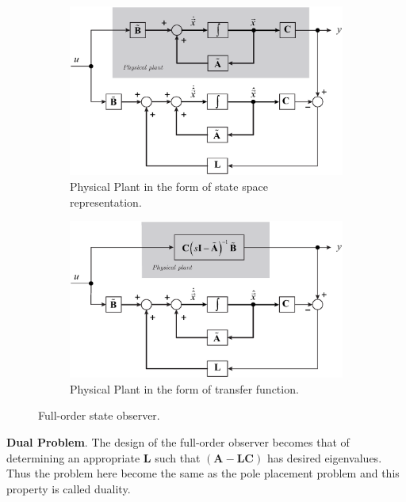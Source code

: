 \documentclass[11pt,a4paper,oneside]{book}
\numberwithin{equation}{section}
\theoremstyle{it}
\theoremstyle{definition}
\begin{document}
\begin{figure}[H]
	\centering
	\begin{subfigure}{.75\textwidth}
	\centering
	\includegraphics[width = 340pt, 
	keepaspectratio]{figures/state_observer_1.eps}
	\captionsetup{width = 0.5\textwidth}
	\caption{Physical Plant in the form of state space representation.}
	\label{figure_state_observer1}
	\end{subfigure} 

	\begin{subfigure}{.75\textwidth}
	\centering
	\includegraphics[width = 340pt, 
	keepaspectratio]{figures/state_observer_2.eps}
		\captionsetup{width = 0.5\textwidth}
		\caption{Physical Plant in the form of transfer function.}
	\label{figure_state_observer2}
	\end{subfigure}
	\caption{Full-order state observer.}
	\label{figure_state_observer}
\end{figure}

\vspace{5mm}
\textbf{Dual Problem}. The design of the full-order observer becomes that of determining an appropriate $\mathbf{L}$ such that $(\mathbf{A-LC})$ has desired eigenvalues. Thus the problem here become the same as the pole placement problem and this property is called duality.
\end{document}
